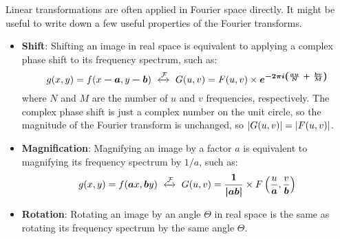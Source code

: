 Linear transformations are often applied in Fourier space directly. It might be useful to write down a few useful properties of the Fourier transforms.

\begin{itemize}
    \item \textbf{Shift}: Shifting an image in real space is equivalent to applying a complex phase shift to its frequency spectrum, such as:
    \begin{equation}
        g(x,y) = f(x\bm{-a},y\bm{-b})\ \xleftrightarrow{\mathcal{F}}\ G(u,v) = F(u,v) \times \bm{ e^{ -2\pi i \left( \frac{au}{N}\ +\ \frac{bv}{M} \right) } }
    \end{equation}
    where $N$ and $M$ are the number of $u$ and $v$ frequencies, respectively. The complex phase shift is just a complex number on the unit circle, so the magnitude of the Fourier transform is unchanged, so $\lvert G(u,v)\rvert = \lvert F(u,v)\rvert$.
            
    \item \textbf{Magnification}: Magnifying an image by a factor $a$ is equivalent to magnifying its frequency spectrum by $1/a$, such as:
    \begin{equation}
        g(x,y) = f(\bm{a}x, \bm{b}y)\ \xleftrightarrow{\mathcal{F}}\ G(u,v) = \bm{\frac{1}{\abs{ab}}} \times F\left(\frac{u}{\bm{a}},\frac{v}{\bm{b}}\right)
    \end{equation}
            
    \item \textbf{Rotation}: Rotating an image by an angle $\Theta$ in real space is the same as rotating its frequency spectrum by the same angle $\Theta$.
\end{itemize}


\newpage


\newpage


\newpage


\newpage


\newpage


\newpage


\newpage


\newpage


\newpage

